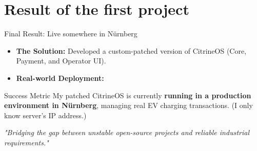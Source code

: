 \documentclass[11pt]{beamer}
\begin{document}
\section{Result of the first project}

\begin{frame}{Final Result: Live somewhere in Nürnberg}
    \begin{itemize}
        \item \textbf{The Solution:} Developed a custom-patched version of CitrineOS (Core, Payment, and Operator UI).
        \item \textbf{Real-world Deployment:}
    \end{itemize}

    \begin{exampleblock}{Success Metric}
        My patched CitrineOS is currently \textbf{running in a production environment in Nürnberg}, managing real EV charging transactions.
        (I only know server's IP address.)
    \end{exampleblock}

    \begin{center}
        \textit{"Bridging the gap between unstable open-source projects and reliable industrial requirements."}
    \end{center}
\end{frame}
\end{document}

